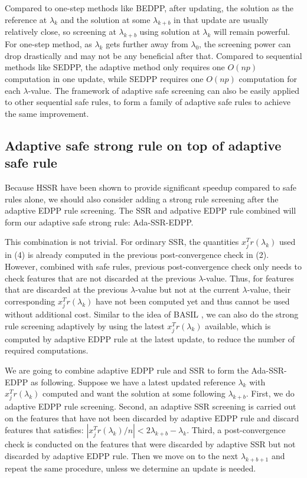 \documentclass{article}
\begin{document}
Compared to one-step methods like BEDPP, after updating, the solution as the reference at $\lambda_k$ and the solution at some $\lambda_{k+b}$ in that update are usually relatively close, so screening at $\lambda_{k+b}$ using solution at $\lambda_k$ will remain powerful. For one-step method, as $\lambda_k$ gets further away from $\lambda_0$, the screening power can drop drastically and
may not be any beneficial after that. Compared to sequential methods like SEDPP, the adaptive method only requires one $O(np)$ computation in one update, while SEDPP requires one $O(np)$ computation for each $\lambda$-value. The framework of adaptive safe screening can also be easily applied to other sequential safe rules, to form a family of adaptive safe rules to achieve the same improvement.

\subsection{Adaptive safe strong rule on top of adaptive safe rule}

Because HSSR \citep{zeng2017efficient} have been shown to provide significant speedup compared to safe rules alone, we should also consider adding a strong rule screening after the adaptive EDPP rule screening. The SSR and adpative EDPP rule combined will form our adaptive safe strong rule: Ada-SSR-EDPP.

This combination is not trivial. For ordinary SSR, the quantities $x_j^Tr(\lambda_k)$ used in (4) is already computed in the previous post-convergence check in (2). However, combined with safe rules, previous post-convergence check only needs to check features that are not discarded at the previous $\lambda$-value. Thus, for features that are discarded at the previous $\lambda$-value but not at the current $\lambda$-value, their corresponding $x_j^Tr(\lambda_k)$ have not been computed yet and thus cannot be used without additional cost. Similar to the idea of BASIL \citep{qian2019fast}, we can also do the strong rule screening adaptively by using the latest $x_j^Tr(\lambda_k)$ available, which is computed by adaptive EDPP rule at the latest update, to reduce the number of required computations.

We are going to combine adaptive EDPP rule and SSR to form the Ada-SSR-EDPP as following. Suppose we have a latest updated reference $\lambda_k$ with $x_j^Tr(\lambda_k)$ computed and want the solution at some following $\lambda_{k+b}$. First, we do adaptive EDPP rule screening. Second, an adaptive SSR screening is carried out on the features that have not been discarded by adaptive EDPP rule and discard features that satisfies: $|x_j^Tr(\lambda_k)/n|<2\lambda_{k+b}-\lambda_k$. Third, a post-convergence check is conducted on the features that were discarded by adaptive SSR but not discarded by adaptive EDPP rule. Then we move on to the next $\lambda_{k+b+1}$ and repeat the same procedure, unless we determine an update is needed.
\end{document}
